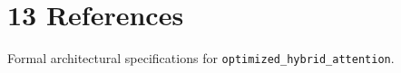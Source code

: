 \section{13 References}

Formal architectural specifications for \texttt{optimized_hybrid_attention}.
